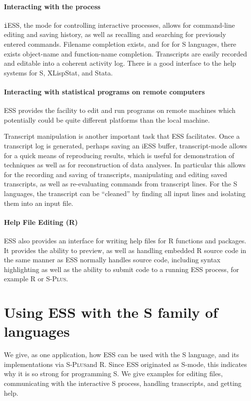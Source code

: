 \documentclass{article}
\newcommand*{\Splus}{\textsc{S-Plus}}
\begin{document}
\paragraph{Interacting with the process}
{\texttt iESS}, the mode for controlling interactive processes, allows for
command-line editing and saving history, as well as recalling and
searching for previously entered commands.  Filename completion
exists, and for for S languages, there exists object-name and
function-name completion.  Transcripts are easily recorded and
editable into a coherent activity log.  There is a good interface to
the help systems for S, XLispStat, and Stata.

\paragraph{Interacting with statistical programs on remote computers}
ESS provides the facility to edit and run programs on remote machines
which potentially could be quite different platforms than the local
machine.

Transcript manipulation is another important task that ESS
facilitates.  Once a transcript log is generated, perhaps saving an
iESS buffer, transcript-mode allows for a quick means of reproducing
results, which is useful for demonstration of techniques as well as
for reconstruction of data analyses.  In particular this allows for
the recording and saving of transcripts, manipulating and editing
saved transcripts, as well as re-evaluating commands from transcript
lines.  For the S languages, the transcript can be ``cleaned'' by
finding all input lines and isolating them into an input file.

\paragraph{Help File Editing (R)}
ESS also provides an interface for writing help files for R functions
and packages.  It provides the ability to preview, as well as handling
embedded R source code in the same manner as ESS normally handles
source code, including syntax highlighting as well as the ability to
submit code to a running ESS process, for example R or \Splus.

\section{Using ESS with the S family of languages}
\label{sec:S}

We give, as one application, how ESS can be used with the S language,
and its implementations via \Splus and R.  Since ESS originated as
S-mode, this indicates why it is so strong for programming S.  We give
examples for editing files, communicating with the interactive S
process, handling transcripts, and getting help.
\end{document}
